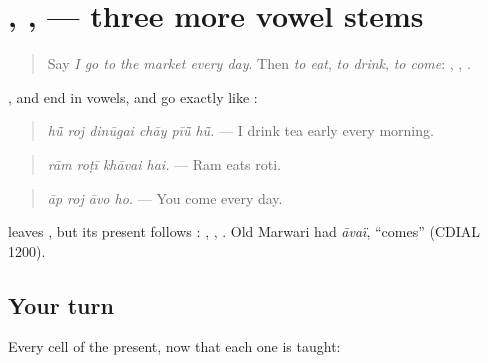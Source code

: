 \section[\texorpdfstring{\mw{खाऊं} · \mw{पीवै} · \mw{आवै} (khāū̃ · pīvai · āvai)}{खाऊं · पीवै · आवै (khāū̃ · pīvai · āvai)}]{, ,  — three more vowel stems}

\label{lesson:MW-C155-khau-pivai}



\begin{quote}
Say \emph{I go to the market every day}. Then \emph{to eat}, \emph{to drink}, \emph{to come}: \textbf{}, \textbf{}, \textbf{}.
\end{quote}

\begin{grammarlens}[title={Grammar Lens: the same three endings}]
\textbf{}, \textbf{} and \textbf{} end in vowels, and go exactly like \textbf{}:

\begin{quote}
\textbf{     }
\end{quote}

\begin{quote}
\emph{hū̃ roj dinūgai chāy pīū̃ hū̃.} — I drink tea early every morning.
\end{quote}

\begin{quote}
\textbf{   }
\end{quote}

\begin{quote}
\emph{rām roṭī khāvai hai.} — Ram eats roti.
\end{quote}

\begin{quote}
\textbf{   }
\end{quote}

\begin{quote}
\emph{āp roj āvo ho.} — You come every day.
\end{quote}

\textbf{} leaves \textbf{}, but its present follows \textbf{}: \textbf{}, \textbf{}, \textbf{}. Old Marwari had \emph{āvaï}, \textquotedblleft{}comes\textquotedblright{} (CDIAL 1200).
\end{grammarlens}

\subsection*{Your turn}
Every cell of the present, now that each one is taught:

